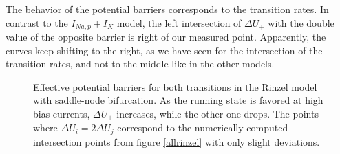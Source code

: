 \documentclass[12pt,a4paper]{article}
\begin{document}
The behavior of the potential barriers corresponds to the transition rates. In contrast to the $I_{Na,p}+I_K$ model, the left intersection of $\Delta U_+$ with the double value of the opposite barrier is right of our measured point. Apparently, the curves keep shifting to the right, as we have seen for the intersection of the transition rates, and not to the middle like in the other models.
\begin{figure}[H]
	\hspace*{-0.5cm}
	\caption{Effective potential barriers for both transitions in the Rinzel model with saddle-node bifurcation. As the running state is favored at high bias currents, $\Delta U_+$ increases, while the other one drops. The points where $\Delta U_i=2\Delta U_j$ correspond to the numerically computed intersection points from figure \ref{allrinzel} with only slight deviations.}
\end{figure}
\end{document}
